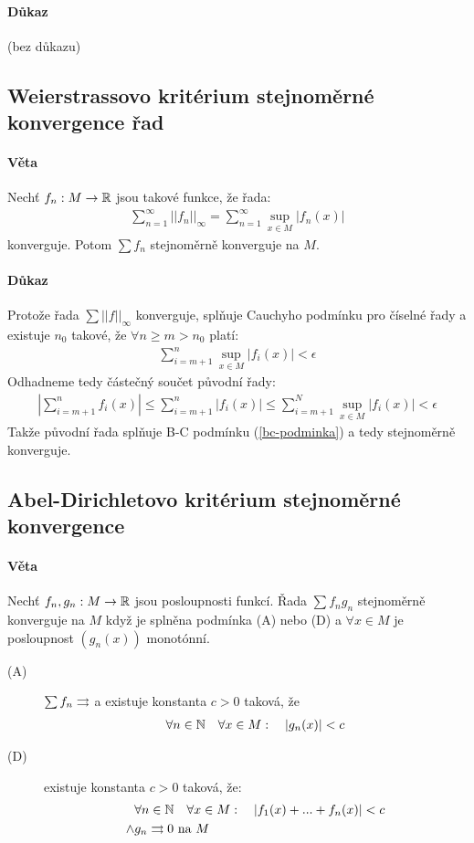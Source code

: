 \documentclass[a4paper,10pt]{article}
\begin{document}
\paragraph{Důkaz}
(bez důkazu)



\subsection{Weierstrassovo kritérium stejnoměrné konvergence řad}
\label{weierstrassovo-kriterium}
\setcounter{equation}{0}
\paragraph{Věta}
Nechť $f_n : M \to \mathbb{R}$ jsou takové funkce, že řada:
\begin{align*}
	\sum_{n=1}^\infty ||f_n||_\infty = \sum_{n=1}^\infty \sup_{x\in M} |f_n(x)|
\end{align*}
konverguje. Potom $\sum f_n$ stejnoměrně konverguje na $M$.
\paragraph{Důkaz}
Protože řada $\sum ||f||_\infty$ konverguje, splňuje Cauchyho podmínku pro
číselné řady a existuje $n_0$ takové, že $\forall n \ge m > n_0$ platí:
\begin{align}
	\sum_{i=m+1}^n \sup_{x\in M} |f_i(x)| < \epsilon
\end{align}
Odhadneme tedy částečný součet původní řady:
\begin{align}
	\left| \sum_{i=m+1}^n f_i(x)  \right| \le \sum_{i=m+1}^n |f_i(x)| \le
	\sum_{i=m+1}^N \sup_{x \in M} |f_i(x)| < \epsilon
\end{align}
Takže původní řada splňuje B-C podmínku (\ref{bc-podminka}) a tedy stejnoměrně konverguje.


\subsection{Abel-Dirichletovo kritérium stejnoměrné konvergence}
\setcounter{equation}{0}
\paragraph{Věta}
Nechť $f_n, g_n: M \to \mathbb{R}$ jsou posloupnosti funkcí. Řada $\sum f_n g_n$
stejnoměrně konverguje na $M$ když je splněna podmínka (A) nebo (D)
	a $\forall x \in M$ je posloupnost $(g_n(x))$ monotónní.
\begin{description}
	\item[(A)] $\sum f_n \rightrightarrows$ a existuje konstanta $c > 0$ taková, že 
	\begin{align*}
		\forall	n \in \mathbb{N} \quad \forall x \in M: \quad |g_n(x)| < c
	\end{align*}
	\item[(D)] existuje konstanta $c > 0$ taková, že:
	\begin{align*}
		&\forall n \in \mathbb{N} \quad \forall x \in M: \quad |f_1(x) + ... + f_n(x)| <
		c \\
		\land &g_n \rightrightarrows 0 \text{ na } M
	\end{align*}
\end{description}
\end{document}
